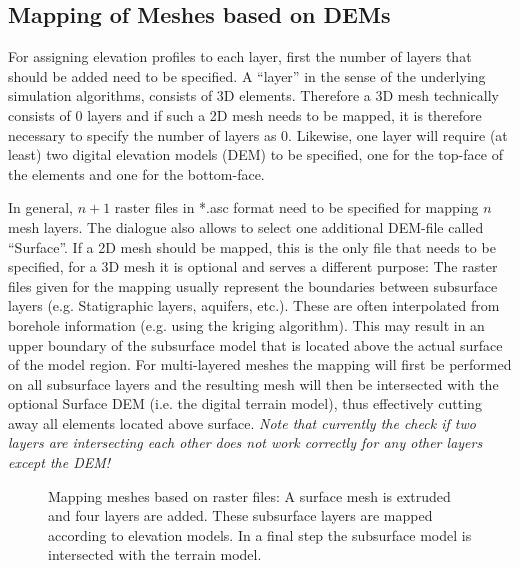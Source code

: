 \subsection{Mapping of Meshes based on DEMs}

For assigning elevation profiles to each layer, first the number of layers that should be added need to be specified. A ``layer'' in the sense of the underlying simulation algorithms, consists of 3D elements. Therefore a 3D mesh technically consists of $0$ layers and if such a 2D mesh needs to be mapped, it is therefore necessary to specify the number of layers as $0$. Likewise, one layer will require (at least) two digital elevation models (DEM) to be specified, one for the top-face of the elements and one for the bottom-face. 

In general, $n+1$ raster files in *.asc format need to be specified for mapping $n$ mesh layers. The dialogue also allows to select one additional DEM-file called ``Surface''. If a 2D mesh should be mapped, this is the only file that needs to be specified, for a 3D mesh it is optional and serves a different purpose: The raster files given for the mapping usually represent the boundaries between subsurface layers (e.g. Statigraphic layers, aquifers, etc.). These are often interpolated from borehole information (e.g. using the kriging algorithm). This may result in an upper boundary of the subsurface model that is located above the actual surface of the model region. For multi-layered meshes the mapping will first be performed on all subsurface layers and the resulting mesh will then be intersected with the optional Surface DEM (i.e. the digital terrain model), thus effectively cutting away all elements located above surface. \emph{Note that currently the check if two layers are intersecting each other does \emph{not} work correctly for any other layers except the DEM!}

\begin{figure}[tb]
\begin{center}
\enspace
{}\enspace
{}
\end{center}
\caption{Mapping meshes based on raster files: A surface mesh is extruded and four layers are added. These subsurface layers are mapped according to elevation models. In a final step the subsurface model is intersected with the terrain model.}
\label{fig:RasterMapping}
\end{figure}

